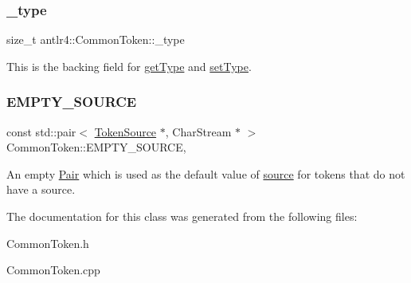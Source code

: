 \subsubsection{\texorpdfstring{\+\_\+type}{\_type}}
{\footnotesize\ttfamily size\+\_\+t antlr4\+::\+Common\+Token\+::\+\_\+type\hspace{0.3cm}{\ttfamily [protected]}}

This is the backing field for \hyperlink{classantlr4_1_1CommonToken_ac0b41ca2dab18549439230ecd832be6b}{get\+Type} and \hyperlink{}{set\+Type}. \mbox{\label{classantlr4_1_1CommonToken_a667bc5a6c9106158af496b25b92b54be}} 
\subsubsection{\texorpdfstring{E\+M\+P\+T\+Y\+\_\+\+S\+O\+U\+R\+CE}{EMPTY\_SOURCE}}
{\footnotesize\ttfamily const std\+::pair$<$ \hyperlink{classantlr4_1_1TokenSource}{Token\+Source} $\ast$, Char\+Stream $\ast$ $>$ Common\+Token\+::\+E\+M\+P\+T\+Y\+\_\+\+S\+O\+U\+R\+CE\hspace{0.3cm}{\ttfamily [static]}, {\ttfamily [protected]}}

An empty \hyperlink{}{Pair} which is used as the default value of \hyperlink{}{source} for tokens that do not have a source. 

The documentation for this class was generated from the following files\+:\begin{DoxyCompactItemize}
\item 
Common\+Token.\+h\item 
Common\+Token.\+cpp\end{DoxyCompactItemize}

